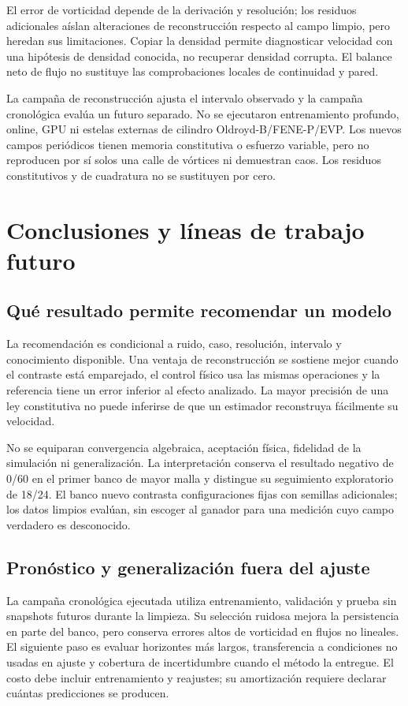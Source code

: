 \documentclass[11pt,oneside,openany]{book}
\begin{document}
El error de vorticidad depende de la derivación y resolución; los
residuos adicionales aíslan alteraciones de reconstrucción respecto al
campo limpio, pero heredan sus limitaciones. Copiar la densidad permite
diagnosticar velocidad con una hipótesis de densidad conocida, no
recuperar densidad corrupta. El balance neto de flujo no sustituye las
comprobaciones locales de continuidad y pared.

La campaña de reconstrucción ajusta el intervalo observado y la campaña
cronológica evalúa un futuro separado. No se ejecutaron entrenamiento
profundo, online, GPU ni estelas externas de cilindro Oldroyd-B/FENE-P/EVP.
Los nuevos campos periódicos tienen memoria constitutiva o esfuerzo variable,
pero no reproducen por sí solos una calle de vórtices ni demuestran caos.
Los residuos constitutivos y de cuadratura no se sustituyen por cero.

\chapter{Conclusiones y líneas de trabajo futuro}


\section{Qué resultado permite recomendar un modelo}
La recomendación es condicional a ruido, caso, resolución, intervalo y
conocimiento disponible. Una ventaja de reconstrucción se sostiene mejor
cuando el contraste está emparejado, el control físico usa las mismas
operaciones y la referencia tiene un error inferior al efecto analizado.
La mayor precisión de una ley constitutiva no puede inferirse de que un
estimador reconstruya fácilmente su velocidad.

No se equiparan convergencia algebraica, aceptación física, fidelidad de la
simulación ni generalización. La interpretación conserva el resultado
negativo de 0/60 en el primer banco de mayor malla y distingue su seguimiento
exploratorio de 18/24. El banco nuevo contrasta configuraciones fijas con
semillas adicionales; los datos limpios evalúan, sin escoger al ganador para
una medición cuyo campo verdadero es desconocido.

\section{Pronóstico y generalización fuera del ajuste}
La campaña cronológica ejecutada utiliza entrenamiento, validación y prueba
sin snapshots futuros durante la limpieza. Su selección ruidosa mejora la
persistencia en parte del banco, pero conserva errores altos de vorticidad en
flujos no lineales. El siguiente paso es evaluar horizontes más largos,
transferencia a condiciones no usadas en ajuste y cobertura de incertidumbre
cuando el método la entregue. El costo debe incluir entrenamiento y reajustes;
su amortización requiere declarar cuántas predicciones se producen.
\end{document}

